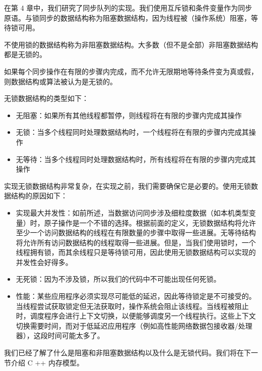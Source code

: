 在第 4 章中，我们研究了同步队列的实现。我们使用互斥锁和条件变量作为同步原语。与锁同步的数据结构称为阻塞数据结构，因为线程被（操作系统）阻塞，等待锁可用。

不使用锁的数据结构称为非阻塞数据结构。大多数（但不是全部）非阻塞数据结构都是无锁的。

如果每个同步操作在有限的步骤内完成，而不允许无限期地等待条件变为真或假，则数据结构或算法被认为是无锁的。

无锁数据结构的类型如下：

\begin{itemize}
\item
无阻塞：如果所有其他线程都暂停，则线程将在有限的步骤内完成其操作

\item
无锁：当多个线程同时处理数据结构时，一个线程将在有限的步骤内完成其操作

\item
无等待：当多个线程同时处理数据结构时，所有线程将在有限的步骤内完成其操作
\end{itemize}

实现无锁数据结构非常复杂，在实现之前，我们需要确保它是必要的。使用无锁数据结构的原因如下：

\begin{itemize}
\item
实现最大并发性：如前所述，当数据访问同步涉及细粒度数据（如本机类型变量）时，原子操作是一个不错的选择。根据前面的定义，无锁数据结构将允许至少一个访问数据结构的线程在有限数量的步骤中取得一些进展。无等待结构将允许所有访问数据结构的线程取得一些进展。但是，当我们使用锁时，一个线程拥有锁，而其余线程只是等待锁可用，因此使用无锁数据结构可以实现的并发性会好得多。

\item
无死锁：因为不涉及锁，所以我们的代码中不可能出现任何死锁。

\item
性能：某些应用程序必须实现尽可能低的延迟，因此等待锁定是不可接受的。当线程尝试获取锁定但无法获取时，操作系统会阻止该线程。当线程被阻止时，调度程序会进行上下文切换，以便能够调度另一个线程执行。这些上下文切换需要时间，而对于低延迟应用程序（例如高性能网络数据包接收器/处理器），这段时间可能太多了。
\end{itemize}

我们已经了解了什么是阻塞和非阻塞数据结构以及什么是无锁代码。我们将在下一节介绍 C ++ 内存模型。






















